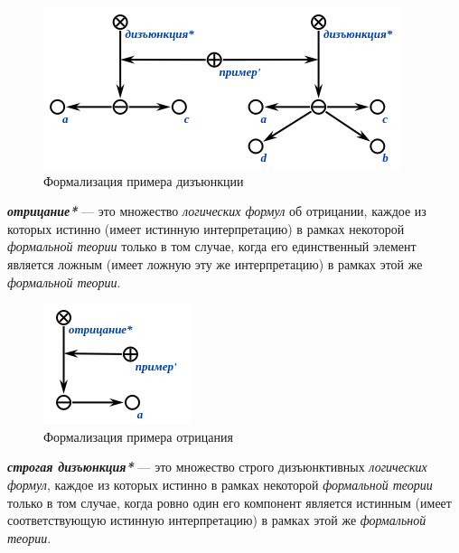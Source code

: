 \begin{figure}[http]
	\includegraphics[scale=0.8]{author/part2/figures/logic/disjunction.png}
	\caption{Формализация примера дизъюнкции}
	\label{fig:disjunction}
\end{figure}

\begin{SCn}
\end{SCn}

\textbf{\textit{отрицание*}} --- это множество \textit{логических формул} об отрицании, каждое из которых истинно (имеет истинную интерпретацию) в рамках некоторой \textit{формальной теории} только в том случае, когда его единственный элемент является ложным (имеет ложную эту же интерпретацию) в рамках этой же \textit{формальной теории}.

\begin{figure}[http]
	\includegraphics[scale=0.8]{author/part2/figures/logic/negation.png}
	\caption{Формализация примера отрицания}
	\label{fig:negation}
\end{figure}

\begin{SCn}
\end{SCn}

\textbf{\textit{строгая дизъюнкция*}} --- это множество строго дизъюнктивных \textit{логических формул}, каждое из которых истинно в рамках некоторой \textit{формальной теории} только в том случае, когда ровно один его компонент является истинным (имеет соответствующую истинную интерпретацию) в рамках этой же \textit{формальной теории}.


